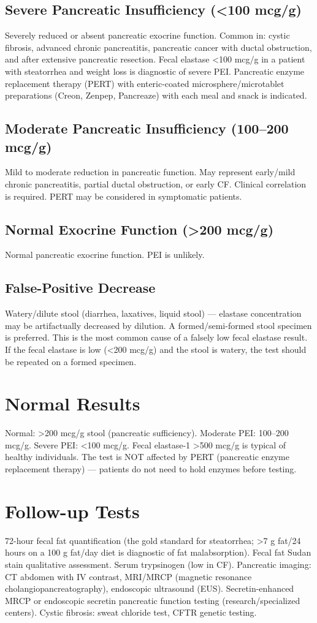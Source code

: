 \subsection*{Severe Pancreatic Insufficiency (<100 mcg/g)}
Severely reduced or absent pancreatic exocrine function. Common in: cystic fibrosis, advanced chronic pancreatitis, pancreatic cancer with ductal obstruction, and after extensive pancreatic resection. Fecal elastase <100 mcg/g in a patient with steatorrhea and weight loss is diagnostic of severe PEI. Pancreatic enzyme replacement therapy (PERT) with enteric-coated microsphere/microtablet preparations (Creon, Zenpep, Pancreaze) with each meal and snack is indicated.
\subsection*{Moderate Pancreatic Insufficiency (100--200 mcg/g)}
Mild to moderate reduction in pancreatic function. May represent early/mild chronic pancreatitis, partial ductal obstruction, or early CF. Clinical correlation is required. PERT may be considered in symptomatic patients.
\subsection*{Normal Exocrine Function (>200 mcg/g)}
Normal pancreatic exocrine function. PEI is unlikely.
\subsection*{False-Positive Decrease}
Watery/dilute stool (diarrhea, laxatives, liquid stool) --- elastase concentration may be artifactually decreased by dilution. A formed/semi-formed stool specimen is preferred. This is the most common cause of a falsely low fecal elastase result. If the fecal elastase is low (<200 mcg/g) and the stool is watery, the test should be repeated on a formed specimen.
\section*{Normal Results}
Normal: >200 mcg/g stool (pancreatic sufficiency). Moderate PEI: 100--200 mcg/g. Severe PEI: <100 mcg/g. Fecal elastase-1 >500 mcg/g is typical of healthy individuals. The test is NOT affected by PERT (pancreatic enzyme replacement therapy) --- patients do not need to hold enzymes before testing.
\section*{Follow-up Tests}
72-hour fecal fat quantification (the gold standard for steatorrhea; >7 g fat/24 hours on a 100 g fat/day diet is diagnostic of fat malabsorption). Fecal fat Sudan stain qualitative assessment. Serum trypsinogen (low in CF). Pancreatic imaging: CT abdomen with IV contrast, MRI/MRCP (magnetic resonance cholangiopancreatography), endoscopic ultrasound (EUS). Secretin-enhanced MRCP or endoscopic secretin pancreatic function testing (research/specialized centers). Cystic fibrosis: sweat chloride test, CFTR genetic testing.
